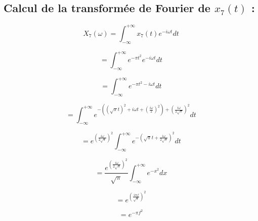 \documentclass[12pt]{article}
\begin{document}
\subsection{Calcul de la transformée de Fourier de $x_7(t)$ :}
$$X_7(\omega) = \int_{-\infty}^{+\infty} x_7(t) e^{-i\omega t}dt$$

$$= \int_{-\infty}^{+\infty} e^{-\pi t^2} e^{-i\omega t}dt$$

$$= \int_{-\infty}^{+\infty} e^{-\pi t^2 -i\omega t}dt$$

$$= \int_{-\infty}^{+\infty} e^{-((\sqrt{\pi} t)^2 +i\omega t + (\frac{i\omega}{2})^2) + (\frac{i\omega}{2\sqrt{\pi}})^2}dt$$

$$= e^{(\frac{i\omega}{2\sqrt{\pi}})^2} \int_{-\infty}^{+\infty} e^{-(\sqrt{\pi}t + \frac{i\omega}{2\sqrt{\pi}})^2}dt$$

$$= \frac{e^{(\frac{i\omega}{2\sqrt{\pi}})^2}}{\sqrt{\pi}} \int_{-\infty}^{+\infty} e^{-x^2}dx$$

$$= e^{(\frac{i\pi f}{\sqrt{\pi}})^2}$$

$$= e^{-\pi f^2}$$
\end{document}
